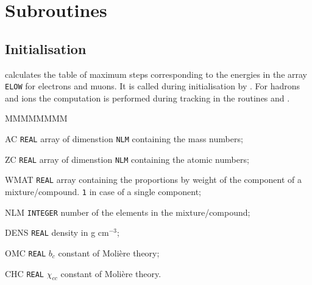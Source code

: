   
\section{Subroutines}
\subsection{Initialisation}

 calculates the table of maximum
steps corresponding to the
energies in the array {\tt ELOW} for electrons and muons.
It is called during initialisation by .
For hadrons and ions the computation is performed during 
tracking in the routines  and .

\begin{DLtt}{MMMMMMMM}
\item[AC] {\tt REAL} array of dimenstion {\tt NLM} containing
the mass numbers;
\item[ZC] {\tt REAL} array  of dimenstion {\tt NLM} 
containing the atomic numbers;
\item[WMAT] {\tt REAL} array containing the proportions by
weight of the component of a mixture/compound. {\tt 1} in case
of a single component;
\item[NLM] {\tt INTEGER} number of the elements in the mixture/compound;
\item[DENS] {\tt REAL} density in g cm$^{-3}$;
\item[OMC] {\tt REAL} $b_{c}$ constant of Moli\`{e}re theory;
\item[CHC] {\tt REAL} $\chi_{cc}$ constant of Moli\`{e}re theory.
\end{DLtt}

